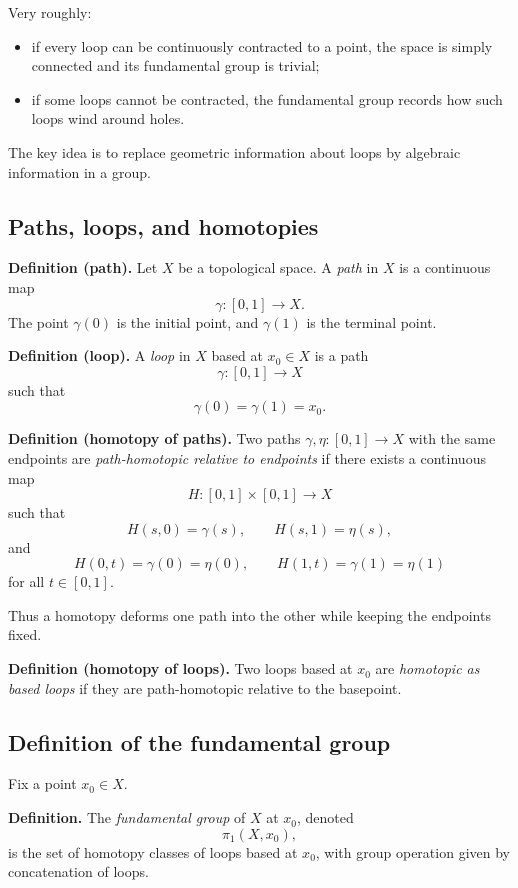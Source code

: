 \documentclass[12pt,a4paper]{article}
\theoremstyle{notespace}
\begin{document}
Very roughly:

\begin{itemize}
	\item if every loop can be continuously contracted to a point, the space is simply connected and its fundamental group is trivial;
	\item if some loops cannot be contracted, the fundamental group records how such loops wind around holes.
\end{itemize}

The key idea is to replace geometric information about loops by algebraic information in a group.

\subsection{Paths, loops, and homotopies}

\textbf{Definition (path).}
Let \(X\) be a topological space. A \emph{path} in \(X\) is a continuous map
\[
\gamma:[0,1]\to X.
\]
The point \(\gamma(0)\) is the initial point, and \(\gamma(1)\) is the terminal point.

\medskip

\textbf{Definition (loop).}
A \emph{loop} in \(X\) based at \(x_0\in X\) is a path
\[
\gamma:[0,1]\to X
\]
such that
\[
\gamma(0)=\gamma(1)=x_0.
\]

\medskip

\textbf{Definition (homotopy of paths).}
Two paths \(\gamma,\eta:[0,1]\to X\) with the same endpoints are \emph{path-homotopic relative to endpoints} if there exists a continuous map
\[
H:[0,1]\times[0,1]\to X
\]
such that
\[
H(s,0)=\gamma(s),\qquad H(s,1)=\eta(s),
\]
and
\[
H(0,t)=\gamma(0)=\eta(0),\qquad H(1,t)=\gamma(1)=\eta(1)
\]
for all \(t\in[0,1]\).

Thus a homotopy deforms one path into the other while keeping the endpoints fixed.

\medskip

\textbf{Definition (homotopy of loops).}
Two loops based at \(x_0\) are \emph{homotopic as based loops} if they are path-homotopic relative to the basepoint.

\subsection{Definition of the fundamental group}

Fix a point \(x_0\in X\).

\textbf{Definition.}
The \emph{fundamental group} of \(X\) at \(x_0\), denoted
\[
\pi_1(X,x_0),
\]
is the set of homotopy classes of loops based at \(x_0\), with group operation given by concatenation of loops.
\end{document}
